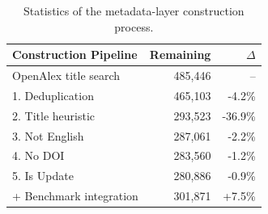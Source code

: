 \begin{table}[t]
\centering
\sffamily
\renewcommand{\arraystretch}{1.2}
\caption{Statistics of the metadata-layer construction process.}
\begin{tabular*}{\columnwidth}{@{\extracolsep{\fill}}lrr}
\toprule
\textbf{Construction Pipeline} & \textbf{Remaining} & $\Delta$ \\
\midrule
OpenAlex title search & 485{,}446 & -- \\
1. Deduplication & 465{,}103 & -4.2\% \\
2. Title heuristic & 293{,}523 & -36.9\% \\
3. Not English & 287{,}061 & -2.2\% \\
4. No DOI & 283{,}560 & -1.2\% \\
5. Is Update & 280{,}886 & -0.9\% \\
\midrule
+ Benchmark integration & 301{,}871 & +7.5\% \\
\bottomrule
\end{tabular*}
\label{tab:sr4all-metadata-filtering}
\end{table}
